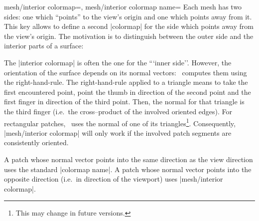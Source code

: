 {{\begin{pgfplotskeylist}{%
	mesh/interior colormap=,%
	mesh/interior colormap name=}
	Each mesh has two sides: one which ``points'' to the view's origin and one which points away from it. This key allows to define a second |colormap| for the side which points away from the view's origin. The motivation is to distinguish between the outer side and the interior parts of a surface:
\pgfplotsexpensiveexample
\begin{codeexample}[]
\end{codeexample}

	\noindent The |interior colormap| is often the one for the ```inner side''. However, the orientation of the surface depends on its normal vectors: \PGFPlots\ computes them using the right-hand-rule. The right-hand-rule applied to a triangle means to take the first encountered point, point the thumb in direction of the second point and the first finger in direction of the third point. Then, the normal for that triangle is the third finger (i.e.\ the cross--product of the involved oriented edges). For rectangular patches, \PGFPlots\ uses the normal of one of its triangles\footnote{This may change in future versions.}. Consequently, |mesh/interior colormap| will only work if the involved patch segments are consistently oriented. 
	
	A patch whose normal vector points into the same direction as the view direction uses the standard |colormap name|. A patch whose normal vector points into the opposite direction (i.e.\ in direction of the viewport) uses |mesh/interior colormap|.

\pgfplotsexpensiveexample
\begin{codeexample}[]
\end{codeexample}


\end{pgfplotskeylist}}}

